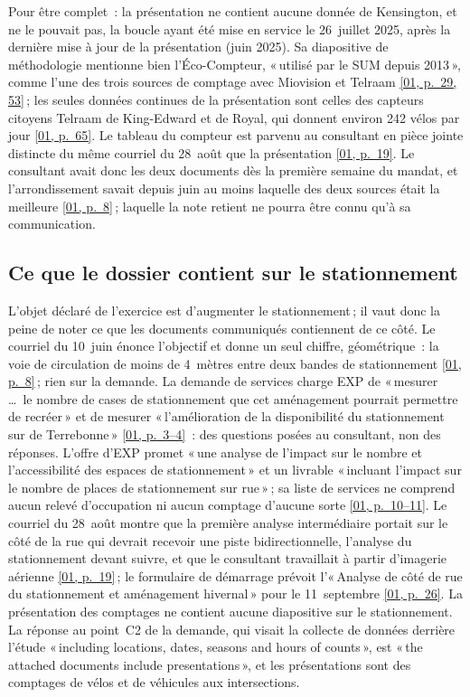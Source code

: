 \documentclass[11pt,letterpaper]{article}
\newcommand{\pagesurl}{https://openmobilitydata.github.io/Terrebonne-access-requests}
\newcommand{\pgl}[3]{\href{\pagesurl/\csname bundle#1\endcsname\#page=#2}{\textsf{\small[#1, p.~#3]}}}
\newcommand{\pg}[2]{\pgl{#1}{#2}{#2}}
\begin{document}
Pour être complet~: la présentation ne contient aucune donnée de
Kensington, et ne le pouvait pas, la boucle ayant été mise en service le
26~juillet 2025, après la dernière mise à jour de la présentation (juin
2025). Sa diapositive de méthodologie mentionne bien l'Éco-Compteur,
«\,utilisé par le SUM depuis 2013\,», comme l'une des trois sources de
comptage avec Miovision et Telraam \pgl{01}{53}{29, 53}\,; les seules
données continues de la présentation sont celles des capteurs citoyens
Telraam de King-Edward et de Royal, qui donnent environ 242 vélos par jour
\pg{01}{65}. Le tableau du compteur est parvenu au consultant en pièce
jointe distincte du même courriel du 28~août que la présentation
\pg{01}{19}. Le consultant avait donc les deux documents dès la première
semaine du mandat, et l'arrondissement savait depuis juin au moins laquelle
des deux sources était la meilleure \pg{01}{8}\,; laquelle la note retient
ne pourra être connu qu'à sa communication.

\subsection{Ce que le dossier contient sur le stationnement}

L'objet déclaré de l'exercice est d'augmenter le stationnement\,; il vaut
donc la peine de noter ce que les documents communiqués contiennent de ce
côté. Le courriel du 10~juin énonce l'objectif et donne un seul chiffre,
géométrique~: la voie de circulation de moins de 4~mètres entre deux bandes
de stationnement \pg{01}{8}\,; rien sur la demande. La demande de services
charge EXP de «\,mesurer \ldots\ le nombre de cases de stationnement que cet
aménagement pourrait permettre de recréer\,» et de mesurer
«\,l'amélioration de la disponibilité du stationnement sur de
Terrebonne\,» \pgl{01}{3}{3--4}~: des questions posées au consultant, non
des réponses. L'offre d'EXP promet «\,une analyse de l'impact sur le nombre
et l'accessibilité des espaces de stationnement\,» et un livrable
«\,incluant l'impact sur le nombre de places de stationnement sur rue\,»\,;
sa liste de services ne comprend aucun relevé d'occupation ni aucun
comptage d'aucune sorte \pgl{01}{10}{10--11}. Le courriel du 28~août montre
que la première analyse intermédiaire portait sur le côté de la rue qui
devrait recevoir une piste bidirectionnelle, l'analyse du stationnement
devant suivre, et que le consultant travaillait à partir d'imagerie
aérienne \pg{01}{19}\,; le formulaire de démarrage prévoit l'«\,Analyse de
côté de rue du stationnement et aménagement hivernal\,» pour le
11~septembre \pg{01}{26}. La présentation des comptages ne contient aucune
diapositive sur le stationnement. La réponse au point~C2 de la demande, qui
visait la collecte de données derrière l'étude «\,including locations,
dates, seasons and hours of counts\,», est «\,the attached documents include
presentations\,», et les présentations sont des comptages de vélos et de
véhicules aux intersections.
\end{document}
